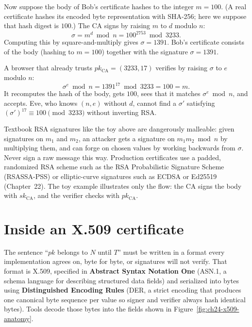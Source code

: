 Now suppose the body of Bob's certificate hashes to the integer $m = 100$. (A real certificate hashes its encoded byte representation with SHA-256; here we suppose that hash digest is $100$.) The CA signs by raising $m$ to $d$ modulo $n$:
\[
\sigma = m^{d} \bmod n = 100^{2753} \bmod 3233.
\]
Computing this by square-and-multiply gives $\sigma = 1391$. Bob's certificate consists of the body (hashing to $m = 100$) together with the signature $\sigma = 1391$.

A browser that already trusts $pk_{\mathrm{CA}} = (3233,17)$ verifies by raising $\sigma$ to $e$ modulo $n$:
\[
\sigma^{e} \bmod n = 1391^{17} \bmod 3233 = 100 = m.
\]
It recomputes the hash of the body, gets $100$, sees that it matches $\sigma^e \bmod n$, and accepts. Eve, who knows $(n,e)$ without $d$, cannot find a $\sigma'$ satisfying $(\sigma')^{17} \equiv 100 \pmod{3233}$ without inverting RSA.

\begin{trapbox}
Textbook RSA signatures like the toy above are dangerously malleable: given signatures on $m_1$ and $m_2$, an attacker gets a signature on $m_1 m_2 \bmod n$ by multiplying them, and can forge on chosen values by working backwards from $\sigma$. Never sign a raw message this way. Production certificates use a padded, randomized RSA scheme such as the RSA Probabilistic Signature Scheme (RSASSA-PSS) or elliptic-curve signatures such as ECDSA or Ed25519 (Chapter~22). The toy example illustrates only the flow: the CA signs the body with $sk_{\mathrm{CA}}$, and the verifier checks with $pk_{\mathrm{CA}}$.
\end{trapbox}

\section{Inside an X.509 certificate}
\label{ch24:x509}

The sentence ``$pk$ belongs to $N$ until $T$'' must be written in a format every implementation agrees on, byte for byte, or signatures will not verify. That format is X.509, specified in \textbf{Abstract Syntax Notation One} (ASN.1, a schema language for describing structured data fields) and serialized into bytes using \textbf{Distinguished Encoding Rules} (DER, a strict encoding that produces one canonical byte sequence per value so signer and verifier always hash identical bytes). Tools decode those bytes into the fields shown in Figure~\ref{fig:ch24-x509-anatomy}.

